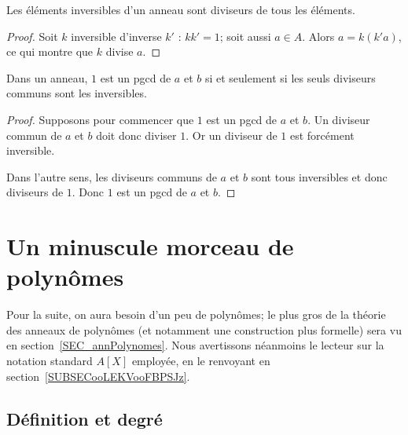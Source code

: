 \begin{lemma}
    Les éléments inversibles d'un anneau sont diviseurs de tous les éléments.
\end{lemma}

\begin{proof}
    Soit \( k\) inversible d'inverse \( k'\) : \( kk'=1\); soit aussi \( a\in A\). Alors \( a=k(k'a)\), ce qui montre que \( k\) divise \( a\).
\end{proof}

\begin{lemma}
    Dans un anneau, \( 1\) est un pgcd de \( a\) et \( b\) si et seulement si les seuls diviseurs communs sont les inversibles.
\end{lemma}

\begin{proof}
    Supposons pour commencer que \( 1\) est un pgcd de \( a\) et \( b\). Un diviseur commun de \( a\) et \( b\) doit donc diviser \( 1\). Or un diviseur de \( 1\) est forcément inversible.

    Dans l'autre sens, les diviseurs communs de \( a\) et \( b\) sont tous inversibles et donc diviseurs de \( 1\). Donc \( 1\) est un pgcd de \( a\) et \( b\).
\end{proof}

\section{Un minuscule morceau de polynômes}
\label{SEC_minusPolynomes}

  Pour la suite, on aura besoin d'un peu de polynômes; le plus gros de la théorie des anneaux de polynômes (et notamment une construction plus formelle) sera vu en section~\ref{SEC_annPolynomes}. Nous avertissons néanmoins le lecteur sur la notation standard \( A[X]\) employée, en le renvoyant en section~\ref{SUBSECooLEKVooFBPSJz}.

\subsection{Définition et degré}

